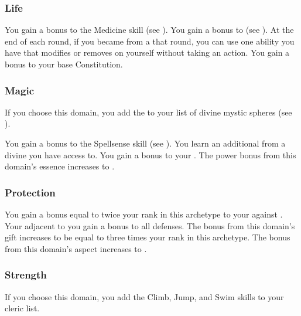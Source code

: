         \subsubsection{Life}
             You gain a  bonus to the Medicine skill (see ).
             You gain a  bonus to  (see ).
             At the end of each round, if you became  from a  that round, you can use one  ability you have that modifies  or removes  on yourself without taking an action.
             You gain a  bonus to your base Constitution.

        \subsubsection{Magic}
            If you choose this domain, you add the   to your list of divine mystic spheres (see ).

             You gain a  bonus to the Spellsense skill (see ).
             You learn an additional  from a divine  you have access to.
             You gain a  bonus to your  .
             The power bonus from this domain's essence increases to .

        \subsubsection{Protection}
             You gain a bonus equal to twice your rank in this archetype to your  against .
             Your  adjacent to you gain a  bonus to all defenses.
             The bonus from this domain's gift increases to be equal to three times your rank in this archetype.
             The bonus from this domain's aspect increases to .

        \subsubsection{Strength}
            If you choose this domain, you add the Climb, Jump, and Swim skills to your cleric  list.


